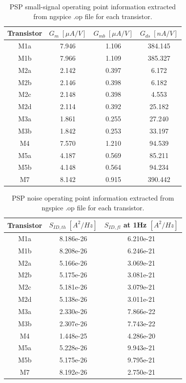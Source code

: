 \documentclass[
  a4paper,
  DIV=11,
  numbers=noendperiod]{scrreprt}
\begin{document}
\begin{longtable}[]{@{}cccc@{}}

\caption{\label{tbl-ng_op2}PSP small-signal operating point information
extracted from ngspice .op file for each transistor.}

\tabularnewline

\toprule\noalign{}
Transistor & \(G_m\;[\mu A/V]\) & \(G_{mb}\;[\mu A/V]\) &
\(G_{ds}\;[nA/V]\) \\
\midrule\noalign{}
\endhead
\bottomrule\noalign{}
\endlastfoot
M1a & 7.946 & 1.106 & 384.145 \\
M1b & 7.966 & 1.109 & 385.327 \\
M2a & 2.142 & 0.397 & 6.172 \\
M2b & 2.146 & 0.398 & 6.182 \\
M2c & 2.148 & 0.398 & 4.553 \\
M2d & 2.114 & 0.392 & 25.182 \\
M3a & 1.861 & 0.255 & 27.240 \\
M3b & 1.842 & 0.253 & 33.197 \\
M4 & 7.570 & 1.210 & 94.539 \\
M5a & 4.187 & 0.569 & 85.211 \\
M5b & 4.148 & 0.564 & 94.234 \\
M7 & 8.142 & 0.915 & 390.442 \\

\end{longtable}

\begin{longtable}[]{@{}ccc@{}}

\caption{\label{tbl-ng_op3}PSP noise operating point information
extracted from ngspice .op file for each transistor.}

\tabularnewline

\toprule\noalign{}
Transistor & \(S_{ID,th}\;[A^2/Hz]\) & \(S_{ID,fl}\) at 1Hz
\([A^2/Hz]\) \\
\midrule\noalign{}
\endhead
\bottomrule\noalign{}
\endlastfoot
M1a & 8.186e-26 & 6.210e-21 \\
M1b & 8.208e-26 & 6.246e-21 \\
M2a & 5.166e-26 & 3.069e-21 \\
M2b & 5.175e-26 & 3.081e-21 \\
M2c & 5.181e-26 & 3.079e-21 \\
M2d & 5.138e-26 & 3.011e-21 \\
M3a & 2.330e-26 & 7.866e-22 \\
M3b & 2.307e-26 & 7.743e-22 \\
M4 & 1.448e-25 & 4.286e-20 \\
M5a & 5.228e-26 & 9.943e-21 \\
M5b & 5.175e-26 & 9.795e-21 \\
M7 & 8.192e-26 & 2.750e-21 \\

\end{longtable}
\end{document}
